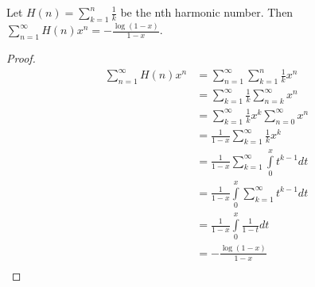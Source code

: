\begin{proposition}\label{prop:sumofharmonicpowers}
Let \(H(n) = \sum\limits_{k=1}^n \frac{1}{k}\) be the nth harmonic number.
Then \(\sum\limits_{n=1}^\infty H(n) x^n = -\frac{\log(1 - x)}{1 - x}\).
\end{proposition}

\begin{proof}
\begin{align*}
\sum\limits_{n=1}^\infty H(n) x^n & = \sum\limits_{n=1}^\infty \sum\limits_{k=1}^n \frac{1}{k} x^n \\
& = \sum\limits_{k=1}^\infty \frac{1}{k} \sum\limits_{n=k}^\infty x^n \\
& = \sum\limits_{k=1}^\infty \frac{1}{k} x^k \sum\limits_{n=0}^\infty x^n \\
& = \frac{1}{1 - x} \sum\limits_{k=1}^\infty \frac{1}{k} x^k \\
& = \frac{1}{1 - x} \sum\limits_{k=1}^\infty \int\limits_0^x t^{k - 1} dt \\
& = \frac{1}{1 - x} \int\limits_0^x  \sum\limits_{k=1}^\infty t^{k - 1} dt \\
& = \frac{1}{1 - x} \int\limits_0^x \frac{1}{1 - t} dt \\
& = - \frac{\log(1 - x)}{1 - x} \\
\end{align*}
\end{proof}

